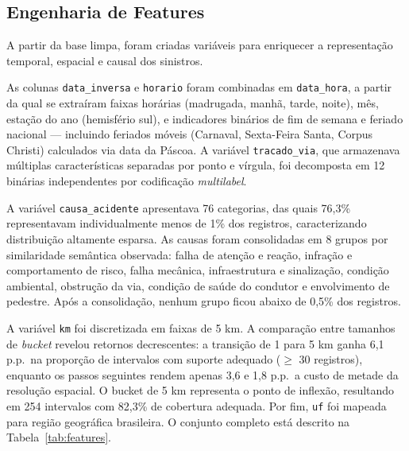 \documentclass[12pt]{article}
\begin{document}
\subsection{Engenharia de Features}

A partir da base limpa, foram criadas variáveis para enriquecer
a representação temporal, espacial e causal dos sinistros.

As colunas \texttt{data\_inversa} e \texttt{horario} foram combinadas
em \texttt{data\_hora}, a partir da qual se extraíram faixas horárias
(madrugada, manhã, tarde, noite), mês, estação do ano (hemisfério sul),
e indicadores binários de fim de semana e feriado nacional — incluindo
feriados móveis (Carnaval, Sexta-Feira Santa, Corpus Christi) calculados
via data da Páscoa. A variável \texttt{tracado\_via}, que armazenava
múltiplas características separadas por ponto e vírgula, foi decomposta
em 12 binárias independentes por codificação \textit{multilabel}.

A variável \texttt{causa\_acidente} apresentava 76 categorias, das quais
76,3\% representavam individualmente menos de 1\% dos registros,
caracterizando distribuição altamente esparsa. As causas foram
consolidadas em 8 grupos por similaridade semântica observada:
falha de atenção e reação, infração e comportamento de risco, falha
mecânica, infraestrutura e sinalização, condição ambiental, obstrução
da via, condição de saúde do condutor e envolvimento de pedestre.
Após a consolidação, nenhum grupo ficou abaixo de 0,5\% dos registros.

A variável \texttt{km} foi discretizada em faixas de 5 km. A comparação
entre tamanhos de \textit{bucket} revelou retornos decrescentes: a
transição de 1 para 5 km ganha 6,1 p.p.\ na proporção de intervalos
com suporte adequado ($\geq$ 30 registros), enquanto os passos
seguintes rendem apenas 3,6 e 1,8 p.p.\ a custo de metade da
resolução espacial. O bucket de 5 km representa o ponto de inflexão,
resultando em 254 intervalos com 82,3\% de cobertura adequada.
Por fim, \texttt{uf} foi mapeada para região geográfica brasileira.
O conjunto completo está descrito na Tabela~\ref{tab:features}.
\end{document}
